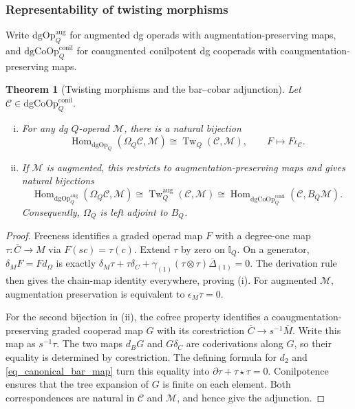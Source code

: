 \documentclass[11pt,letterpaper]{article}
\numberwithin{equation}{section}
\theoremstyle{plain}
\newtheorem{thm}{Theorem}[section]
\theoremstyle{definition}
\theoremstyle{remark}
\newcommand{\Hom}{\operatorname{Hom}}
\begin{document}
\subsubsection{Representability of twisting morphisms}
Write $\mathrm{dgOp}^{\mathrm{aug}}_Q$ for augmented dg operads with augmentation-preserving maps, and $\mathrm{dgCoOp}^{\mathrm{conil}}_Q$ for coaugmented conilpotent dg cooperads with coaugmentation-preserving maps.
\begin{thm}[Twisting morphisms and the bar--cobar adjunction]\label{thm_bar_cobar_adjunction}
Let $\mathscr C\in\mathrm{dgCoOp}^{\mathrm{conil}}_Q$.
\begin{enumerate}[(i)]
\item For any dg $Q$-operad $\mathscr M$, there is a natural bijection
\begin{equation}\label{eq:fc_cobar_representability}
\Hom_{\mathrm{dgOp}_Q}(\Omega_Q\mathscr C,\mathscr M)
 \cong\operatorname{Tw}_Q(\mathscr C,\mathscr M),\qquad F\longmapsto F\iota_{\mathscr C}.
\end{equation}
\item If $\mathscr M$ is augmented, this restricts to augmentation-preserving maps and gives natural bijections
\begin{equation*}\Hom_{\mathrm{dgOp}^{\mathrm{aug}}_Q}(\Omega_Q\mathscr C,\mathscr M)
 \cong\operatorname{Tw}^{\mathrm{aug}}_Q(\mathscr C,\mathscr M)
 \cong\Hom_{\mathrm{dgCoOp}^{\mathrm{conil}}_Q}(\mathscr C,B_Q\mathscr M).
\end{equation*}
Consequently, $\Omega_Q$ is left adjoint to $B_Q$.
\end{enumerate}
\end{thm}
\begin{proof}
Freeness identifies a graded operad map $F$ with a degree-one map $\tau:\overline C\to M$ via $F(sc)=\tau(c)$. Extend $\tau$ by zero on $\mathbb I_Q$. On a generator, $\delta_MF=Fd_\Omega$ is exactly
$\delta_M\tau+\tau\delta_C+\gamma_{(1)}(\tau\otimes\tau)\overline\Delta_{(1)}=0$.
The derivation rule then gives the chain-map identity everywhere, proving (i). For augmented $\mathscr M$, augmentation preservation is equivalent to $\epsilon_M\tau=0$.

For the second bijection in (ii), the cofree property identifies a coaugmentation-preserving graded cooperad map $G$ with its corestriction $\overline C\to s^{-1}\overline M$. Write this map as $s^{-1}\tau$. The two maps $d_BG$ and $G\delta_C$ are coderivations along $G$, so their equality is determined by corestriction. The defining formula for $d_2$ and \eqref{eq_canonical_bar_map} turn this equality into $\partial\tau+\tau\star\tau=0$. Conilpotence ensures that the tree expansion of $G$ is finite on each element. Both correspondences are natural in $\mathscr C$ and $\mathscr M$, and hence give the adjunction.
\end{proof}
\end{document}
